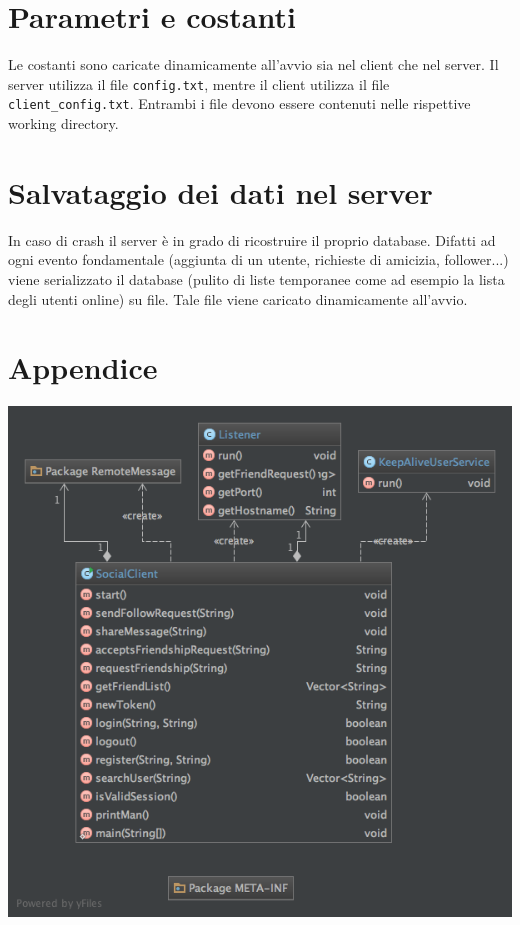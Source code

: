 \documentclass[]{article}
\begin{document}
\section{Parametri e costanti} \label{param}
Le costanti sono caricate dinamicamente all'avvio sia nel client che nel server. Il server utilizza il file \texttt{config.txt}, mentre il client utilizza il file \texttt{client\_config.txt}. Entrambi i file devono essere contenuti nelle rispettive working directory.

\section{Salvataggio dei dati nel server}
In caso di crash il server è in grado di ricostruire il proprio database. Difatti ad ogni evento fondamentale (aggiunta di un utente, richieste di amicizia, follower...) viene serializzato il database (pulito di liste temporanee come ad esempio la lista degli utenti online) su file. Tale file viene caricato dinamicamente all'avvio. 

\section{Appendice}
\includegraphics[width=\linewidth]{Client}
\end{document}
